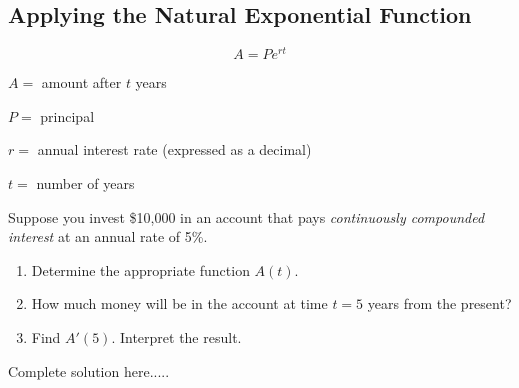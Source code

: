 \subsection*{Applying the Natural Exponential Function}
\begin{tcolorbox}[title=Review: Continuous Compound Interest Formula]
$$A = Pe^{rt}$$

$A = $ amount after $t$ years

$P=$ principal

$r=$ annual interest rate (expressed as a decimal)

$t=$ number of years
\end{tcolorbox}
\begin{example}
Suppose you invest \$10,000 in an account that pays \emph{continuously compounded interest} at an annual rate of 5\%.
\renewcommand{\labelenumi}{\textbf{(\alph{enumi})}}
\begin{enumerate}[leftmargin=*]
\item Determine the appropriate function $A(t)$.
\item How much money will be in the account at time $t=5$ years from the present?
\item Find $A'(5)$. Interpret the result. 
\newpage

\end{enumerate}
    \begin{sol}
    
    \end{sol}
    \begin{solL}
    Complete solution here.....
    
    \end{solL}
    
\end{example}
